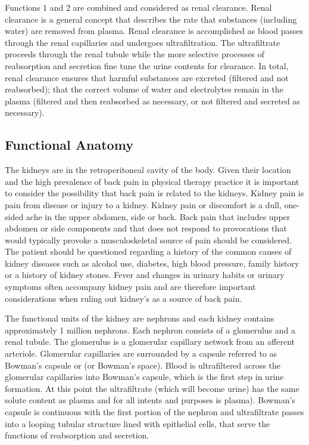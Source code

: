 Functions 1 and 2 are combined and considered as renal clearance. Renal clearance is a general concept that describes the rate that substances (including water) are removed from plasma. Renal clearance is accomplished as blood passes through the renal capillaries and undergoes ultrafiltration. The ultrafiltrate proceeds through the renal tubule while the more selective processes of reabsorption and secretion fine tune the urine contents for clearance. In total, renal clearance ensures that harmful substances are excreted (filtered and not reabsorbed); that the correct volume of water and electrolytes remain in the plasma (filtered and then reabsorbed as necessary, or not filtered and secreted as necessary). 

\subsection{Functional Anatomy}

The kidneys are in the retroperitoneal cavity of the body.  Given their location and the high prevalence of back pain in physical therapy practice it is important to consider the possibility that back pain is related to the kidneys. Kidney pain is pain from disease or injury to a kidney. Kidney pain or discomfort is a dull, one-sided ache in the upper abdomen, side or back. Back pain that includes upper abdomen or side components and that does not respond to provocations that would typically provoke a musculoskeletal source of pain should be considered. The patient should be questioned regarding a history of the common causes of kidney diseases such as alcohol use, diabetes, high blood pressure, family history or a history of kidney stones. Fever and changes in urinary habits or urinary symptoms often accompany kidney pain and are therefore important considerations when ruling out kidney’s as a source of back pain.

The functional units of the kidney are nephrons and each kidney contains approximately 1 million nephrons. Each nephron consists of a glomerulus and a renal tubule. The glomerulus is a glomerular capillary network from an afferent arteriole. Glomerular capillaries are surrounded by a capsule referred to as Bowman’s capsule or (or Bowman’s space).  Blood is ultrafiltered across the glomerular capillaries into Bowman’s capsule, which is the first step in urine formation. At this point the ultrafiltrate (which will become urine) has the same solute content as plasma and for all intents and purposes is plasma). Bowman’s capsule is continuous with the first portion of the nephron and ultrafiltrate passes into a looping tubular structure lined with epithelial cells, that serve the functions of reabsorption and secretion. 

